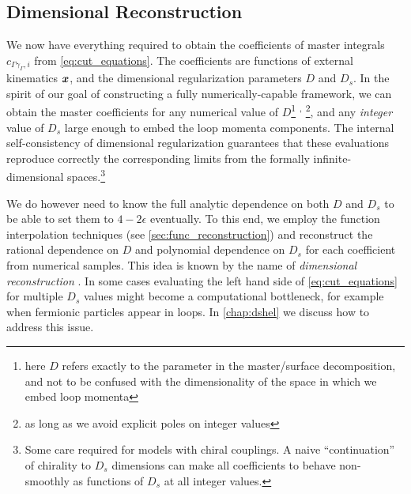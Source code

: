 \subsection{Dimensional Reconstruction}
\label{sec:dimensional_reconstruction}

We now have everything required to obtain the coefficients of master integrals 
$c_{\Gamma\gamma_\Gamma,i}$ from  \cref{eq:cut_equations}.  
The coefficients are functions of external kinematics $\vb*{x}$, and the dimensional regularization parameters $D$ and $D_s$.
In the spirit of our goal of constructing a fully numerically-capable framework, 
we can obtain the master coefficients
for any numerical value of $D$\footnote{
  here $D$ refers exactly to the parameter in the master/surface decomposition,
  and  not to be confused with the dimensionality of the space in which we embed loop momenta
}%
\textsuperscript{,}%
\footnote{as long as we avoid explicit poles on integer values},
and any  \emph{integer} value of $D_s$ large enough to embed the loop momenta components.
The internal self-consistency of dimensional regularization guarantees
that these evaluations reproduce correctly the corresponding limits from the formally infinite-dimensional spaces.\footnote{
  Some care required for models with chiral couplings. A naive ``continuation'' of chirality to $D_s$ dimensions
  can make all coefficients to behave non-smoothly as functions of $D_s$ at all integer values.
}

We do however need to know the full analytic dependence on both $D$ and $D_s$ to be able
to set them to $4-2\epsilon$ eventually.
To this end, we employ the function interpolation techniques (see \cref{sec:func_reconstruction})
and reconstruct the rational dependence on $D$ and polynomial dependence on $D_s$ for each coefficient from numerical samples.
This idea is known by the name of
\emph{dimensional reconstruction} \cite{Giele:2008ve,Ellis:2008ir,Boughezal:2011br,Abreu:2017xsl,Abreu:2017hqn}.
In some cases evaluating the left hand side of \cref{eq:cut_equations} for multiple $D_s$ values might become a computational bottleneck,
for example when fermionic particles appear in loops. In \cref{chap:dshel} we discuss how to address this issue.

